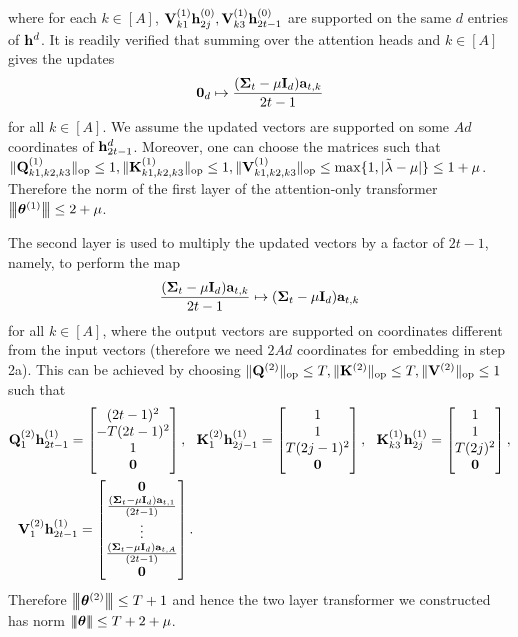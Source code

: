 where for each $k\in[A]$, ${\mathbf V}^{(1)}_{k1}{\mathbf h}^{(0)}_{2j},{\mathbf V}^{(1)}_{k3}{\mathbf h}^{(0)}_{2t-1}$ are supported on the same $d$ entries of ${\mathbf h}^{d}$. 
It is readily verified that  summing over the attention heads and $k\in[A]$ gives the updates
$$ {\mathbf 0}_d\mapsto\frac{({{\mathbf\Sigma}}_t-{\mu}{\mathbf I}_d){\mathbf a}_{t,k}}{2t-1}$$ for all $k\in[A]$. We assume the updated vectors are supported on some $Ad$ coordinates of ${\mathbf h}_{2t-1}^d$. Moreover, one can choose the matrices such that $\|{{\mathbf Q}^{(1)}_{k1,k2,k3}}\|_{\mathrm{op}}\leq1,\|{{\mathbf K}^{(1)}_{k1,k2,k3}}\|_{\mathrm{op}}\leq1,\|{{\mathbf V}^{(1)}_{k1,k2,k3}}\|_{\mathrm{op}}\leq \max\{1,|\tilde\lambda-{\mu}|\}\leq1+{\mu}$. Therefore the norm of the first layer of the attention-only transformer ${\left|\!\left|\!\left|{{\boldsymbol \theta}^{(1)}}\right|\!\right|\!\right|}\leq 2+{\mu}$. 

The second layer is used to multiply the updated vectors by a factor of $2t-1$, namely, to perform the map
$$ \frac{({{\mathbf\Sigma}}_t-{\mu}{\mathbf I}_d){\mathbf a}_{t,k}}{2t-1}\mapsto{({{\mathbf\Sigma}}_t-{\mu}{\mathbf I}_d){\mathbf a}_{t,k}}$$ for all $k\in[A]$, where the output vectors are supported on coordinates different from the input vectors (therefore we need $2Ad$ coordinates for embedding in step 2a). This can be achieved by choosing $\|{{\mathbf Q}^{(2)}}\|_{\mathrm{op}}\leq T, \|{{\mathbf K}^{(2)}}\|_{\mathrm{op}}\leq T, \|{{\mathbf V}^{(2)}}\|_{\mathrm{op}}\leq1$
such that \begin{align*}
    &
    {\mathbf Q}^{(2)}_{1}{\mathbf h}^{(1)}_{2t-1}=\begin{bmatrix}
         (2t-1)^2\\-T(2t-1)^2\\  1\\ {\mathbf 0}
    \end{bmatrix},~~ {\mathbf K}^{(2)}_{1}{\mathbf h}^{(1)}_{2j-1}=\begin{bmatrix}
        1\\1\\ T(2j-1)^2\\{\mathbf 0}
    \end{bmatrix},~~ 
    {\mathbf K}^{(1)}_{k3}{\mathbf h}^{(1)}_{2j}=\begin{bmatrix}
      1\\  1\\  T(2j)^2\\{\mathbf 0}
    \end{bmatrix},\\&~~ {\mathbf V}^{(2)}_{1}{\mathbf h}^{(1)}_{2t-1}=\begin{bmatrix}
        {\mathbf 0}\\ \frac{({{\mathbf\Sigma}}_t-{\mu}{\mathbf I}_d){\mathbf a}_{t,1}}{(2t-1)}
\\\vdots\\
        \frac{({{\mathbf\Sigma}}_t-{\mu}{\mathbf I}_d){\mathbf a}_{t,A}}{(2t-1)} \\ {\mathbf 0}
    \end{bmatrix}.
\end{align*} Therefore ${\left|\!\left|\!\left|{{\boldsymbol \theta}^{(2)}}\right|\!\right|\!\right|}\leq T+1$ and hence the two layer transformer we constructed has norm ${\left|\!\left|\!\left|{{\boldsymbol \theta}}\right|\!\right|\!\right|}\leq T+2+{\mu}$.


